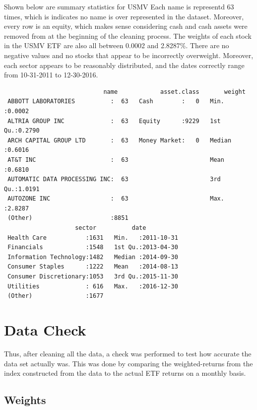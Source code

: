 \documentclass[12pt,twoside]{reedthesis}
\theoremstyle{definition}
\theoremstyle{definition}
\theoremstyle{definition}
\theoremstyle{remark}
\begin{document}
Shown below are summary statistics for USMV Each name is representd 63
times, which is indicates no name is over represented in the dataset.
Moreover, every row is an equity, which makes sense considering cash and
cash assets were removed from at the beginning of the cleaning process.
The weights of each stock in the USMV ETF are also all between 0.0002
and 2.8287\%. There are no negative values and no stocks that appear to
be incorrectly overweight. Moreover, each sector appears to be
reasonably distributed, and the dates correctly range from 10-31-2011 to
12-30-2016.
\begin{verbatim}
                            name            asset.class       weight      
 ABBOTT LABORATORIES          :  63   Cash        :   0   Min.   :0.0002  
 ALTRIA GROUP INC             :  63   Equity      :9229   1st Qu.:0.2790  
 ARCH CAPITAL GROUP LTD       :  63   Money Market:   0   Median :0.6016  
 AT&T INC                     :  63                       Mean   :0.6810  
 AUTOMATIC DATA PROCESSING INC:  63                       3rd Qu.:1.0191  
 AUTOZONE INC                 :  63                       Max.   :2.8287  
 (Other)                      :8851                                       
                    sector          date           
 Health Care           :1631   Min.   :2011-10-31  
 Financials            :1548   1st Qu.:2013-04-30  
 Information Technology:1482   Median :2014-09-30  
 Consumer Staples      :1222   Mean   :2014-08-13  
 Consumer Discretionary:1053   3rd Qu.:2015-11-30  
 Utilities             : 616   Max.   :2016-12-30  
 (Other)               :1677                       
\end{verbatim}
\section{Data Check}\label{data-check}

Thus, after cleaning all the data, a check was performed to test how
accurate the data set actually was. This was done by comparing the
weighted-returns from the index constructed from the data to the actual
ETF returns on a monthly basis.

\subsection{Weights}\label{weights}
\end{document}
